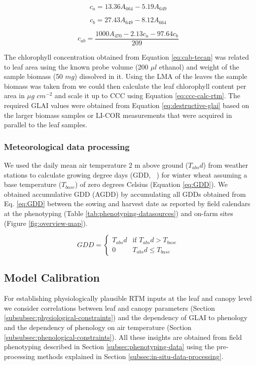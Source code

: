 \begin{equation}
    c_a = 13.36 A_{664} - 5.19 A_{649}
\end{equation}

\begin{equation}
    c_b = 27.43 A_{649} - 8.12 A_{664}
\end{equation}

\begin{equation}
    c_{ab} = \frac{1000 A_{470} - 2.13 c_a - 97.64 c_b}{209}
    \label{eq:cab-tecan}
\end{equation}

The chlorophyll concentration obtained from Equation \ref{eq:cab-tecan} was related to leaf area using the known probe volume (200 $\mu l$ ethanol) and weight of the sample biomass (50 $mg$) dissolved in it. Using the LMA of the leaves the sample biomass was taken from we could then calculate the leaf chlorophyll content per area in $\mu g$ $cm^{-2}$ and scale it up to CCC using Equation \ref{eq:ccc-calc-rtm}. The required GLAI values were obtained from Equation \ref{eq:destructive-glai} based on the larger biomass samples or LI-COR measurements that were acquired in parallel to the leaf samples.

\subsubsection{Meteorological data processing}
\label{subsubsec:meteo-data-processing}

We used the daily mean air temperature 2 m above ground ($T_{abs}d$) from weather stations to calculate growing degree days (GDD, ~\cite{mcmaster_growing_1997}) for winter wheat assuming a base temperature ($T_{base}$) of zero degrees Celsius (Equation \ref{eq:GDD}). We obtained accumulative GDD (AGDD) by accumulating all GDDs obtained from Eq. \ref{eq:GDD} between the sowing and harvest date as reported by field calendars at the phenotyping (Table \ref{tab:phenotyping-datasources}) and on-farm sites (Figure \ref{fig:overview-map}).

\begin{equation}
\label{eq:GDD}
    GDD =
    \begin{cases}
        T_{abs}d & \text{if } T_{abs}d > T_{base} \\
        0 &  T_{abs}d \le T_{base}
    \end{cases}
\end{equation}

\subsection{Model Calibration}
\label{subsec:model-calibration}
For establishing physiologically plausible RTM inputs at the leaf and canopy level we consider correlations between leaf and canopy parameters (Section \ref{subsubsec:physiological-constraints}) and the dependency of GLAI to phenology and the dependency of phenology on air temperature (Section \ref{subsubsec:phenological-constraints}). All these insights are obtained from field phenotyping described in Section \ref{subsec:phenotyping-data} using the pre-processing methods explained in Section \ref{subsec:in-situ-data-processing}.

